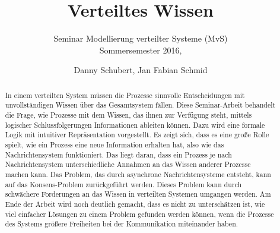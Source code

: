 \documentclass{llncs}
\begin{document}
\title{Verteiltes Wissen}
\subtitle{\small{ Seminar Modellierung verteilter Systeme (MvS)\\ Sommersemester 2016,}}
\author{Danny Schubert, Jan Fabian Schmid\\}
\maketitle

\begin{abstract}
In einem verteilten System müssen die Prozesse sinnvolle Entscheidungen mit unvollständigen Wissen über das Gesamtsystem fällen.
Diese Seminar-Arbeit behandelt die Frage, wie Prozesse mit dem Wissen, das ihnen zur Verfügung steht, mittels logischer Schlussfolgerungen Informationen ableiten können.
Dazu wird eine formale Logik mit intuitiver Repräsentation vorgestellt.
Es zeigt sich, dass es eine große Rolle spielt, wie ein Prozess eine neue Information erhalten hat, also wie das Nachrichtensystem funktioniert. Das liegt daran, dass ein Prozess je nach Nachrichtensystem unterschiedliche Annahmen an das Wissen anderer Prozesse machen kann.
Das Problem, das durch asynchrone Nachrichtensysteme entsteht, kann auf das Konsens-Problem zurückgeführt werden.
Dieses Problem kann durch schwächere Forderungen an das Wissen in verteilten Systemen umgangen werden.
Am Ende der Arbeit wird noch deutlich gemacht, dass es nicht zu unterschätzen ist, wie viel einfacher Lösungen zu einem Problem gefunden werden können, wenn die Prozesse des Systems größere Freiheiten bei der Kommunikation miteinander haben.
\end{abstract}












\end{document}
